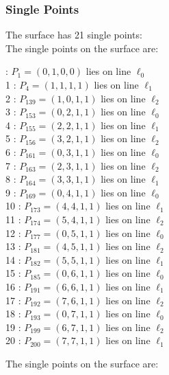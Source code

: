 \documentclass{article}
\begin{document}
{\subsubsection*{Single Points}
The surface has 21 single points:\\
The single points on the surface are:\\
\begin{multicols}{2}
 : $P_{1}=( 0, 1, 0, 0 )$ lies on line $\ell_{0}$\\
1 : $P_{4}=( 1, 1, 1, 1 )$ lies on line $\ell_{1}$\\
2 : $P_{139}=( 1, 0, 1, 1 )$ lies on line $\ell_{2}$\\
3 : $P_{153}=( 0, 2, 1, 1 )$ lies on line $\ell_{0}$\\
4 : $P_{155}=( 2, 2, 1, 1 )$ lies on line $\ell_{1}$\\
5 : $P_{156}=( 3, 2, 1, 1 )$ lies on line $\ell_{2}$\\
6 : $P_{161}=( 0, 3, 1, 1 )$ lies on line $\ell_{0}$\\
7 : $P_{163}=( 2, 3, 1, 1 )$ lies on line $\ell_{2}$\\
8 : $P_{164}=( 3, 3, 1, 1 )$ lies on line $\ell_{1}$\\
9 : $P_{169}=( 0, 4, 1, 1 )$ lies on line $\ell_{0}$\\
10 : $P_{173}=( 4, 4, 1, 1 )$ lies on line $\ell_{1}$\\
11 : $P_{174}=( 5, 4, 1, 1 )$ lies on line $\ell_{2}$\\
12 : $P_{177}=( 0, 5, 1, 1 )$ lies on line $\ell_{0}$\\
13 : $P_{181}=( 4, 5, 1, 1 )$ lies on line $\ell_{2}$\\
14 : $P_{182}=( 5, 5, 1, 1 )$ lies on line $\ell_{1}$\\
15 : $P_{185}=( 0, 6, 1, 1 )$ lies on line $\ell_{0}$\\
16 : $P_{191}=( 6, 6, 1, 1 )$ lies on line $\ell_{1}$\\
17 : $P_{192}=( 7, 6, 1, 1 )$ lies on line $\ell_{2}$\\
18 : $P_{193}=( 0, 7, 1, 1 )$ lies on line $\ell_{0}$\\
19 : $P_{199}=( 6, 7, 1, 1 )$ lies on line $\ell_{2}$\\
20 : $P_{200}=( 7, 7, 1, 1 )$ lies on line $\ell_{1}$\\
\end{multicols}
The single points on the surface are:\\
}
\end{document}
